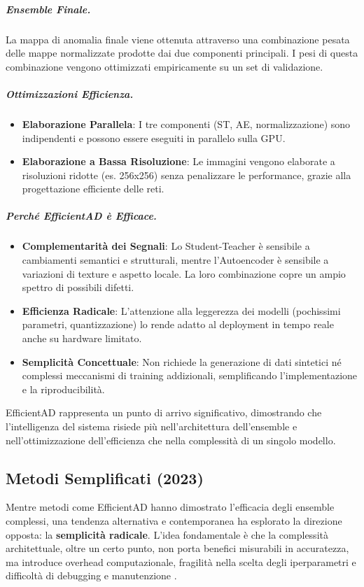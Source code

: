 \subparagraph{Ensemble Finale.}
La mappa di anomalia finale viene ottenuta attraverso una combinazione pesata delle mappe normalizzate prodotte dai due componenti principali. I pesi di questa combinazione vengono ottimizzati empiricamente su un set di validazione. 

\subparagraph{Ottimizzazioni Efficienza.}

\begin{itemize}
    \item \textbf{Elaborazione Parallela}: I tre componenti (ST, AE, normalizzazione) sono indipendenti e possono essere eseguiti in parallelo sulla GPU.
    \item \textbf{Elaborazione a Bassa Risoluzione}: Le immagini vengono elaborate a risoluzioni ridotte (es. 256x256) senza penalizzare le performance, grazie alla progettazione efficiente delle reti.
\end{itemize}

\subparagraph{Perché EfficientAD è Efficace.}
\begin{itemize}
    \item \textbf{Complementarità dei Segnali}: Lo Student-Teacher è sensibile a cambiamenti semantici e strutturali, mentre l'Autoencoder è sensibile a variazioni di texture e aspetto locale. La loro combinazione copre un ampio spettro di possibili difetti.
    \item \textbf{Efficienza Radicale}: L'attenzione alla leggerezza dei modelli (pochissimi parametri, quantizzazione) lo rende adatto al deployment in tempo reale anche su hardware limitato.
    \item \textbf{Semplicità Concettuale}: Non richiede la generazione di dati sintetici né complessi meccanismi di training addizionali, semplificando l'im\-ple\-men\-ta\-zio\-ne e la riproducibilità.
\end{itemize}

EfficientAD rappresenta un punto di arrivo significativo, dimostrando che l'intelligenza del sistema risiede più nell'architettura dell'ensemble e nell'ot\-ti\-miz\-za\-zio\-ne dell'efficienza che nella complessità di un singolo modello.


\subsection{Metodi Semplificati (2023)}
\label{subsec:metodi-semplificati}

Mentre metodi come EfficientAD hanno dimostrato l'efficacia degli ensemble complessi, una tendenza alternativa e contemporanea ha esplorato la direzione opposta: la \textbf{semplicità radicale}. L'idea fondamentale è che la complessità architettuale, oltre un certo punto, non porta benefici misurabili in accuratezza, ma introduce overhead computazionale, fragilità nella scelta degli iperparametri e difficoltà di debugging e manutenzione \cite{liu2023simplenet}.


